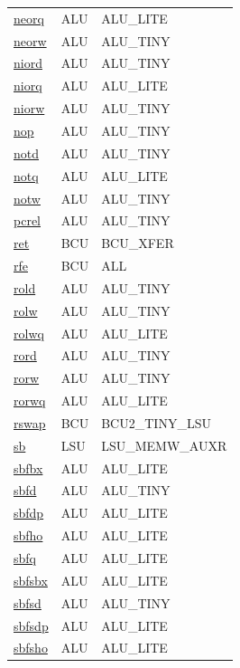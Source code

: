 \begin{small}
\begin{longtable}[l]{l l l}
\hyperlink{lvx.neorq}{neorq} & ALU & ALU\_LITE \\ 
\hyperlink{lvx.neorw}{neorw} & ALU & ALU\_TINY \\ 
\hyperlink{lvx.niord}{niord} & ALU & ALU\_TINY \\ 
\hyperlink{lvx.niorq}{niorq} & ALU & ALU\_LITE \\ 
\hyperlink{lvx.niorw}{niorw} & ALU & ALU\_TINY \\ 
\hyperlink{lvx.nop}{nop} & ALU & ALU\_TINY \\ 
\hyperlink{lvx.notd}{notd} & ALU & ALU\_TINY \\ 
\hyperlink{lvx.notq}{notq} & ALU & ALU\_LITE \\ 
\hyperlink{lvx.notw}{notw} & ALU & ALU\_TINY \\ 
\hyperlink{lvx.pcrel}{pcrel} & ALU & ALU\_TINY \\ 
\hyperlink{lvx.ret}{ret} & BCU & BCU\_XFER \\ 
\hyperlink{lvx.rfe}{rfe} & BCU & ALL \\ 
\hyperlink{lvx.rold}{rold} & ALU & ALU\_TINY \\ 
\hyperlink{lvx.rolw}{rolw} & ALU & ALU\_TINY \\ 
\hyperlink{lvx.rolwq}{rolwq} & ALU & ALU\_LITE \\ 
\hyperlink{lvx.rord}{rord} & ALU & ALU\_TINY \\ 
\hyperlink{lvx.rorw}{rorw} & ALU & ALU\_TINY \\ 
\hyperlink{lvx.rorwq}{rorwq} & ALU & ALU\_LITE \\ 
\hyperlink{lvx.rswap}{rswap} & BCU & BCU2\_TINY\_LSU \\ 
\hyperlink{lvx.sb}{sb} & LSU & LSU\_MEMW\_AUXR \\ 
\hyperlink{lvx.sbfbx}{sbfbx} & ALU & ALU\_LITE \\ 
\hyperlink{lvx.sbfd}{sbfd} & ALU & ALU\_TINY \\ 
\hyperlink{lvx.sbfdp}{sbfdp} & ALU & ALU\_LITE \\ 
\hyperlink{lvx.sbfho}{sbfho} & ALU & ALU\_LITE \\ 
\hyperlink{lvx.sbfq}{sbfq} & ALU & ALU\_LITE \\ 
\hyperlink{lvx.sbfsbx}{sbfsbx} & ALU & ALU\_LITE \\ 
\hyperlink{lvx.sbfsd}{sbfsd} & ALU & ALU\_TINY \\ 
\hyperlink{lvx.sbfsdp}{sbfsdp} & ALU & ALU\_LITE \\ 
\hyperlink{lvx.sbfsho}{sbfsho} & ALU & ALU\_LITE \\ 

\end{longtable}
\end{small}
